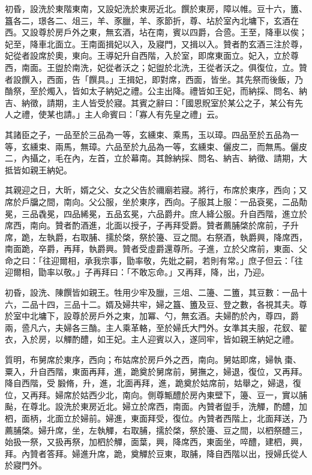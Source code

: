 \begin{pinyinscope}
 初昏，設洗於東階東南，又設妃洗於東房近北。饌於東房，障以帷。豆十六，簠、簋各二，璟各二、俎三，羊、豕臘，羊、豕節折，尊、坫於室內北墉下，玄酒在西。又設尊於房戶外之東，無玄酒，坫在南，賓以四爵，合巹。王至，降車以俟；妃至，降車北面立。王南面揖妃以入，及寢門，又揖以入。贊者酌玄酒三注於尊，妃從者設席於奧，東向。王導妃升自西階，入於室，即席東面立。妃入，立於尊西，南面。王盥於南洗，妃從者沃之；妃盥於北洗，王從者沃之。俱復位，立。贊者設饌入，西面，告「饌具。」王揖妃，即對席，西面，皆坐。其先祭而後飯，乃酳祭，至於燭入，皆如太子納妃之禮。公主出降。禮皆如王妃，而納採、問名、納吉、納徵，請期，主人皆受於寢。其賓之辭曰：「國恩貺室於某公之子，某公有先人之禮，使某也請。」主人命賓曰：「寡人有先皇之禮」云。



 其諸臣之子，一品至於三品為一等，玄纁束、乘馬，玉以璋。四品至於五品為一等，玄纁束、兩馬，無璋。六品至於九品為一等，玄纁束、儷皮二，而無馬。儷皮二，內攝之，毛在內，左首，立於幕南。其餘納採、問名、納吉、納徵、請期，大抵皆如親王納妃。



 其親迎之日，大昕，婿之父、女之父告於禰廟若寢。將行，布席於東序，西向；又席於戶牖之間，南向。父公服，坐於東序，西向。子服其上服：一品袞冕，二品勣冕，三品毳冕，四品絺冕，五品玄冕，六品爵弁。庶人絳公服。升自西階，進立於席西，南向。贊者酌酒進，北面以授子，子再拜受爵。贊者薦脯棨於席前，子升席，跪，左執爵，右取脯、擩於棨，祭於籩、豆之間。右祭酒，執爵興，降席西，南面跪，卒爵，再拜，執爵興。贊者受虛爵還尊所。子進，立於父席前，東面、父命之曰：「往迎爾相，承我宗事，勖率敬，先妣之嗣，若則有常。」庶子但云：「往迎爾相，勖率以敬。」子再拜曰：「不敢忘命。」又再拜，降，出，乃迎。



 初昏，設洗、陳饌皆如親王。牲用少牢及臘，三俎、二籩、二簠，其豆數：一品十六，二品十四，三品十二。婿及婦共牢，婦之簋、簠及豆、登之數，各視其夫。尊於室中北墉下，設尊於房戶外之東，加冪、勺，無玄酒。夫婦酌於內，尊四，爵兩，巹凡六，夫婦各三酳。主人乘革輅，至於婦氏大門外。女準其夫服，花釵、翟衣，入於房，以觶酌醴，如王妃。主人迎賓以入，遂同牢，皆如親王納妃之禮。



 質明，布舅席於東序，西向；布姑席於房戶外之西，南向。舅姑即席，婦執棗、粟入，升自西階，東面再拜，進，跪奠於舅席前，舅撫之，婦退，復位，又再拜。降自西階，受腶脩，升，進，北面再拜，進，跪奠於姑席前，姑舉之，婦退，復位，又再拜。婦席於姑西少北，南向。側尊甒醴於房內東壁下，籩、豆一，實以脯颭，在尊北。設洗於東房近北。婦立於席西，南面。內贊者盥手，洗觶，酌醴，加柶，面柄，北面立於婦前。婦進，東面拜受，復位。內贊者西階上，北面拜送，乃薦脯棨。婦升席，坐，左執觶，右取脯，擩於棨，祭於籩、豆之間，以柶祭醴三，始扱一祭，又扱再祭，加柶於觶，面葉，興，降席西，東面坐，啐醴，建柶，興，拜。內贊者答拜。婦進升席，跪，奠觶於豆東，取脯，降自西階以出，授婦氏從人於寢門外。




\end{pinyinscope}
